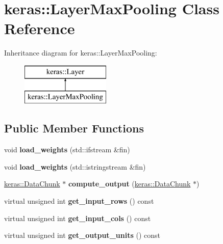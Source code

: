 \hypertarget{classkeras_1_1_layer_max_pooling}{}\section{keras\+:\+:Layer\+Max\+Pooling Class Reference}
\label{classkeras_1_1_layer_max_pooling}
Inheritance diagram for keras\+:\+:Layer\+Max\+Pooling\+:\begin{figure}[H]
\begin{center}
\leavevmode
\includegraphics[height=2.000000cm]{classkeras_1_1_layer_max_pooling}
\end{center}
\end{figure}
\subsection*{Public Member Functions}
\begin{DoxyCompactItemize}
\item 
\mbox{\label{classkeras_1_1_layer_max_pooling_a2888fe35236b5b548c79b378e117b5c1}} 
void {\bfseries load\+\_\+weights} (std\+::ifstream \&fin)
\item 
\mbox{\label{classkeras_1_1_layer_max_pooling_a3bcaf6af0921ab051abb25fc83f180ca}} 
void {\bfseries load\+\_\+weights} (std\+::istringstream \&fin)
\item 
\mbox{\label{classkeras_1_1_layer_max_pooling_a40a3e3a729af250ac7a5dbc6ad60532d}} 
\mbox{\hyperlink{classkeras_1_1_data_chunk}{keras\+::\+Data\+Chunk}} $\ast$ {\bfseries compute\+\_\+output} (\mbox{\hyperlink{classkeras_1_1_data_chunk}{keras\+::\+Data\+Chunk}} $\ast$)
\item 
\mbox{\label{classkeras_1_1_layer_max_pooling_a0161cd63f5d60308511a63c028edcefc}} 
virtual unsigned int {\bfseries get\+\_\+input\+\_\+rows} () const
\item 
\mbox{\label{classkeras_1_1_layer_max_pooling_a08040da50a9b2a7ee0bbf54633cf85e6}} 
virtual unsigned int {\bfseries get\+\_\+input\+\_\+cols} () const
\item 
\mbox{\label{classkeras_1_1_layer_max_pooling_ac34fb0e4fa4cf805a45169f1343f9da4}} 
virtual unsigned int {\bfseries get\+\_\+output\+\_\+units} () const
\end{DoxyCompactItemize}
